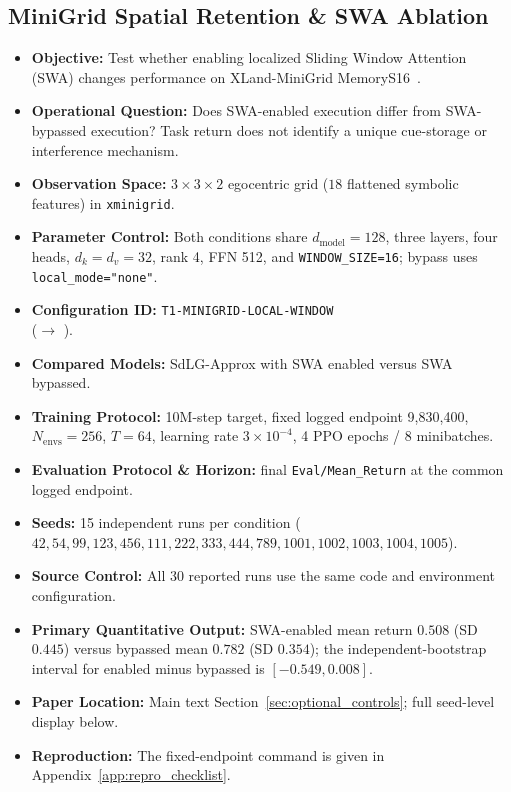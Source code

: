 \subsection{MiniGrid Spatial Retention \& SWA Ablation}
\begin{itemize}
    \item \textbf{Objective:} Test whether enabling localized Sliding Window Attention (SWA) changes performance on XLand-MiniGrid MemoryS16~\cite{minigrid,nikulin2024xland}.
    \item \textbf{Operational Question:} Does SWA-enabled execution differ from SWA-bypassed execution? Task return does not identify a unique cue-storage or interference mechanism.
    \item \textbf{Observation Space:} $3 \times 3 \times 2$ egocentric grid ($18$ flattened symbolic features) in \texttt{xminigrid}.
    \item \textbf{Parameter Control:} Both conditions share $d_{\text{model}}=128$, three layers, four heads, $d_k=d_v=32$, rank 4, FFN 512, and \texttt{WINDOW\_SIZE=16}; bypass uses \texttt{local\_mode="none"}.
    \item \textbf{Configuration ID:} \texttt{T1-MINIGRID-LOCAL-WINDOW} \\ ($\to$ ).
    \item \textbf{Compared Models:} SdLG-Approx with SWA enabled versus SWA bypassed.
    \item \textbf{Training Protocol:} 10M-step target, fixed logged endpoint 9,830,400, $N_{\text{envs}}=256$, $T=64$, learning rate $3\times 10^{-4}$, 4 PPO epochs / 8 minibatches.
    \item \textbf{Evaluation Protocol \& Horizon:} final \texttt{Eval/Mean\_Return} at the common logged endpoint.
    \item \textbf{Seeds:} 15 independent runs per condition ($42,54,99,123,456,111,222,333,444,789,1001,1002,1003,1004,1005$).
    \item \textbf{Source Control:} All 30 reported runs use the same code and environment configuration.
    \item \textbf{Primary Quantitative Output:} SWA-enabled mean return $0.508$ (SD $0.445$) versus bypassed mean $0.782$ (SD $0.354$); the independent-bootstrap interval for enabled minus bypassed is $[-0.549,0.008]$.
    \item \textbf{Paper Location:} Main text Section~\ref{sec:optional_controls}; full seed-level display below.
    \item \textbf{Reproduction:} The fixed-endpoint command is given in Appendix~\ref{app:repro_checklist}.
\end{itemize}

